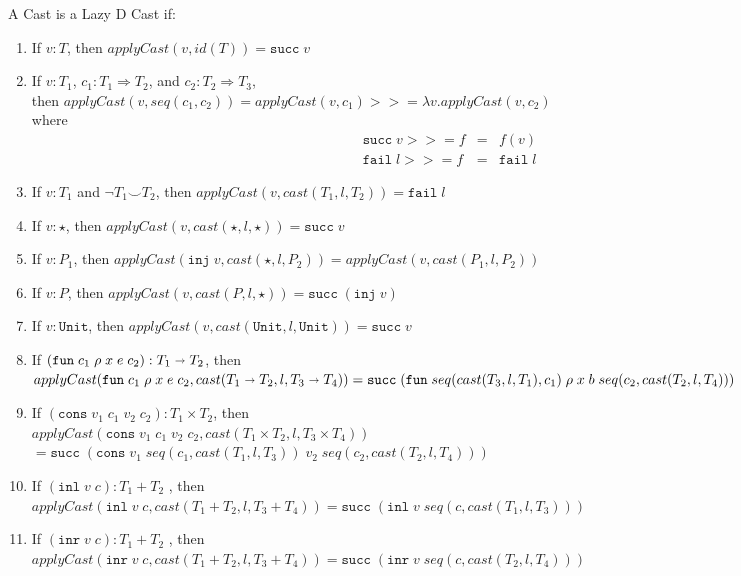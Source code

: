 \documentclass[acmsmall,review,anonymous]{acmart}\settopmatter{printfolios=true,printccs=false,printacmref=false}
\newcommand{\plus}[0]{+}
\newcommand{\judgeType}[2]{#1 : #2}
\newcommand{\judgeTypeFT}[3]{#1 : #2 \Longrightarrow #3} %
\newcommand{\TOOdyn}[0]{\star}
\newcommand{\POOunit}[0]{\mathtt{Unit}}
\newcommand{\POOfun}[2]{#1 \shortrightarrow #2}
\newcommand{\POOprod}[2]{#1 \times #2}
\newcommand{\POOsum}[2]{#1 \plus #2}
\newcommand{\rOOsucc}[1]{\mathtt{succ}\;#1}
\newcommand{\rOOfail}[1]{\mathtt{fail}\;#1}
\newcommand{\hcvOOinj}[2]{\mathtt{inj} \; #2}
\newcommand{\hcvOOfun}[5]{\mathtt{fun} \; #1 \; #2 \; #3 \; #4 \; #5}
\newcommand{\hcvOOcons}[4]{\mathtt{cons}\;#1\;#2\;#3\;#4}
\newcommand{\hcvOOinl}[2]{\mathtt{inl}\;#1\;#2}
\newcommand{\hcvOOinr}[2]{\mathtt{inr}\;#1\;#2}
\begin{document}
\begin{definition}
	\label{def:surely-lazyd}
	A  Cast is a Lazy D Cast if:
	\begin{enumerate}
		\item If $ v : T $, then $ applyCast(v,id(T)) = \mathtt{succ} \; v $
		\item If $ \judgeType{v}{T_1} $,
		$ \judgeTypeFT{c_1}{T_1}{T_2} $, and
		$ \judgeTypeFT{c_2}{T_2}{T_3} $,\\
		then $ applyCast(v,seq(c_1,c_2)) = 
		applyCast(v,c_1) >>= \lambda v.applyCast(v,c_2) $ \\
		where 
		\[
		\begin{array}{rcl}
		\rOOsucc{v} >>= f & = & f(v) \\
		\rOOfail{l} >>= f & = & \rOOfail{l}
		\end{array}
		\]
		\item If $ v : T_1 $ and $ \neg T_1 \smile T_2 $,
		then $ applyCast(v,cast(T_1, l, T_2)) = \rOOfail{l} $
		\item If $ v : \star $, 
		then $ applyCast(v,cast(\TOOdyn,l,\TOOdyn)) = \rOOsucc{v} $
		\item If $ v : P_1 $,
		then $ applyCast(\hcvOOinj{P_1}{v},cast(\star,l,P_2)) 
		= applyCast(v,cast(P_1,l,P_2)) $
		\item If $ v : P $,
		then $ applyCast(v,cast(P,l,\star)) = \rOOsucc{(\hcvOOinj{P}{v})} $
		\item If $ v : \POOunit $,
		then $ applyCast(v,cast(\POOunit,l,\POOunit)) = \rOOsucc{v} $
		\item If $ (\hcvOOfun{c_1}{\rho}{x}{e}{c_2}) : \POOfun{T_1}{T_2} $,
		then\\
		$ 
		applyCast(\hcvOOfun{c_1}{\rho}{x}{e}{c_2}, 
		cast(\POOfun{T_1}{T_2},l,\POOfun{T_3}{T_4})) \\
		= 
		\rOOsucc{(\hcvOOfun{seq(cast(T_3,l,T_1),c_1)}{\rho}{x}{b}{seq(c_2,cast(T_2,l,T_4))})}$
		\item If $ (\hcvOOcons{v_1}{c_1}{v_2}{c_2}) : \POOprod{T_1}{T_2} $,
		then \\
		$ 
		applyCast(\hcvOOcons{v_1}{c_1}{v_2}{c_2},cast(\POOprod{T_1}{T_2},l,T_3 
		\times 
		T_4)) $ \\
		$ = 
		\rOOsucc{(\hcvOOcons{v_1}{seq(c_1,cast(T_1,l,T_3))}{v_2}{seq(c_2,cast(T_2,l,T_4))})}
		$ 
		\item If $ (\hcvOOinl{v}{c}) : \POOsum{T_1}{T_2} $ ,
		then \\
		$ 
		applyCast(\hcvOOinl{v}{c},cast(\POOsum{T_1}{T_2},l,\POOsum{T_3}{T_4}))
		= \rOOsucc{(\hcvOOinl{v}{seq(c,cast(T_1,l,T_3))})} $
		\item If $ (\hcvOOinr{v}{c}) : \POOsum{T_1}{T_2} $ ,
		then \\ $ 
		applyCast(\hcvOOinr{v}{c},cast(\POOsum{T_1}{T_2},l,\POOsum{T_3}{T_4}))
		= \rOOsucc{(\hcvOOinr{v}{seq(c,cast(T_2,l,T_4))})} $
	\end{enumerate}
\end{definition}
\end{document}

